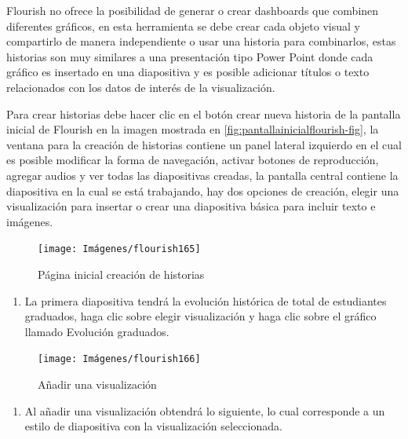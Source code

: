 \documentclass[
]{book}
\providecommand{\tightlist}{%
  \setlength{\itemsep}{0pt}\setlength{\parskip}{0pt}}
\begin{document}
Flourish no ofrece la posibilidad de generar o crear dashboards que combinen diferentes gráficos, en esta herramienta se debe crear cada objeto visual y compartirlo de manera independiente o usar una historia para combinarlos, estas historias son muy similares a una presentación tipo Power Point donde cada gráfico es insertado en una diapositiva y es posible adicionar títulos o texto relacionados con los datos de interés de la visualización.

Para crear historias debe hacer clic en el botón crear nueva historia de la pantalla inicial de Flourish en la imagen mostrada en \ref{fig:pantallainicialflourish-fig}, la ventana para la creación de historias contiene un panel lateral izquierdo en el cual es posible modificar la forma de navegación, activar botones de reproducción, agregar audios y ver todas las diapositivas creadas, la pantalla central contiene la diapositiva en la cual se está trabajando, hay dos opciones de creación, elegir una visualización para insertar o crear una diapositiva básica para incluir texto e imágenes.

\begin{figure}

{\centering \texttt{[image: Imágenes/flourish165]} 

}

\caption{Página inicial creación de historias}\label{fig:pantallaincialhistoriaflourish-fig}
\end{figure}

\begin{enumerate}
\def\labelenumi{\arabic{enumi}.}
\tightlist
\item
  La primera diapositiva tendrá la evolución histórica de total de estudiantes graduados, haga clic sobre elegir visualización y haga clic sobre el gráfico llamado Evolución graduados.
\end{enumerate}

\begin{figure}

{\centering \texttt{[image: Imágenes/flourish166]} 

}

\caption{Añadir una visualización}\label{fig:paso1historiaflourish-fig}
\end{figure}

\begin{enumerate}
\def\labelenumi{\arabic{enumi}.}
\setcounter{enumi}{1}
\tightlist
\item
  Al añadir una visualización obtendrá lo siguiente, lo cual corresponde a un estilo de diapositiva con la visualización seleccionada.
\end{enumerate}
\end{document}
